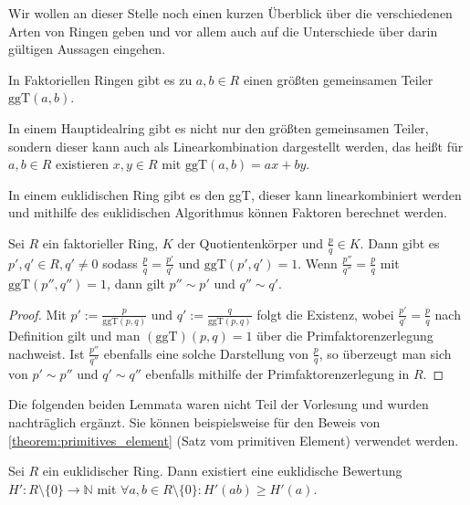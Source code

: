 \begin{remark}
    Wir wollen an dieser Stelle noch einen kurzen Überblick über die verschiedenen Arten von Ringen
    geben und vor allem auch auf die Unterschiede über darin gültigen Aussagen eingehen.

    In Faktoriellen Ringen gibt es zu $a,b\in R$ einen größten gemeinsamen Teiler $\mathrm{ggT}(a,b)$.

    In einem Hauptidealring gibt es nicht nur den größten gemeinsamen Teiler, sondern dieser kann auch als Linearkombination
    dargestellt werden, das heißt für $a,b\in R$ existieren $x,y\in R$ mit $\mathrm{ggT}(a,b)=ax+by$.

    In einem euklidischen Ring gibt es den ggT, dieser kann linearkombiniert werden und mithilfe des euklidischen Algorithmus
    können Faktoren berechnet werden.
\end{remark}

\begin{proposition}
    Sei $R$ ein faktorieller Ring, $K$ der Quotientenkörper und $\frac{p}{q}\in K$. Dann gibt es
    $p',q'\in R, q'\neq 0$ sodass $\frac{p}{q}=\frac{p'}{q'}$ und $\mathrm{ggT}(p',q')=1$. Wenn
    $\frac{p''}{q''}=\frac{p}{q}$ mit $\mathrm{ggT}(p'',q'')=1$, dann gilt $p''\sim p'$ und $q''\sim q'$.
\end{proposition}

\begin{proof}
    Mit $p':=\frac{p}{\mathrm{ggT}(p,q)}$ und $q':=\frac{q}{\mathrm{ggT}(p,q)}$ folgt die Existenz,
    wobei $\frac{p'}{q'}=\frac{p}{q}$ nach Definition gilt und man $\mathrm{(ggT)}(p,q)=1$ über die Primfaktorenzerlegung nachweist.
    Ist $\frac{p''}{q''}$ ebenfalls eine solche Darstellung von $\frac{p}{q}$, so überzeugt man sich
    von $p'\sim p''$ und $q'\sim q''$ ebenfalls mithilfe der Primfaktorenzerlegung in $R$.
\end{proof}

\begin{remark}
    Die folgenden beiden Lemmata waren nicht Teil der Vorlesung und wurden nachträglich ergänzt. Sie können beispielsweise für den Beweis von \cref*{theorem:primitives_element} (Satz vom primitiven Element) verwendet werden.
\end{remark}

\begin{lemma}
    Sei $R$ ein euklidischer Ring. Dann existiert eine euklidische Bewertung $H':R\setminus\{0\}\to \mathbb{N}$ mit $\forall a,b\in R\setminus\{0\}:H'(ab)\geq H'(a)$.
\end{lemma}

